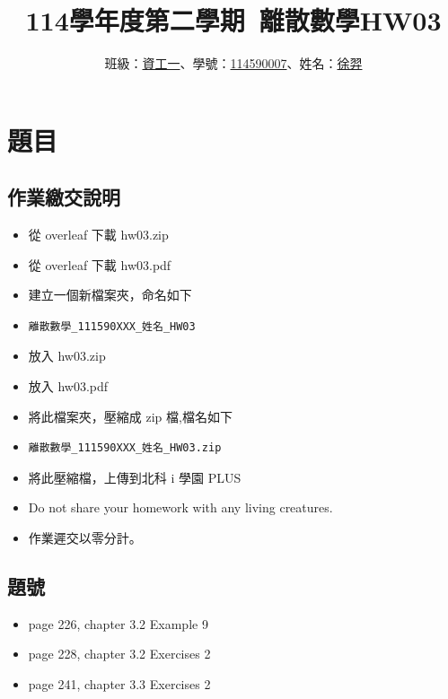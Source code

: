 \documentclass[sigconf]{acmart}
\begin{document}
\title{114學年度第二學期~離散數學HW03}

\author{班級：\underline{資工一}、學號：\underline{114590007}、姓名：\underline{徐羿}}
\orcid{}
\affiliation{%
  \institution{}
  \city{}
  \country{}
}

\maketitle



\section{題目}
\subsection{作業繳交說明}
\begin{shaded}
\begin{itemize}
    \item[-] 從 overleaf 下載 hw03.zip
    \item[-] 從 overleaf 下載 hw03.pdf
    \item[-] 建立一個新檔案夾，命名如下
    \item[-] \color{red}\begin{verbatim}離散數學_111590XXX_姓名_HW03\end{verbatim}
    \item[-] \color{black}放入 hw03.zip
    \item[-] 放入 hw03.pdf
    \item[-] 將此檔案夾，壓縮成 zip 檔,檔名如下
    \item[-] \color{red}\begin{verbatim}離散數學_111590XXX_姓名_HW03.zip\end{verbatim}
    \item[-] \color{black}將此壓縮檔，上傳到北科 i 學園 PLUS
    \item[-] Do not share your homework with any living creatures.
    \item[-] 作業遲交以零分計。
\end{itemize}
\end{shaded}

\subsection{題號}
\begin{shaded}
\begin{itemize}
        \item[-] page 226, chapter 3.2 Example 9
	\item[-] page 228, chapter 3.2 Exercises 2
	\item[-] page 241, chapter 3.3 Exercises 2
\end{itemize}
\end{shaded}
\end{document}
